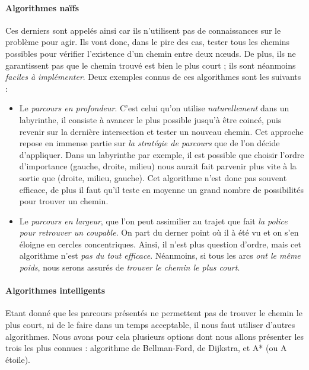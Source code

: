 \paragraph{Algorithmes naïfs} Ces derniers sont appelés ainsi car ils n'utilisent pas de connaissances sur le problème
pour agir. Ils vont donc, dans le pire des cas, tester tous les chemins possibles pour vérifier l'existence d'un chemin
entre deux n\oe{}uds. De plus, ils ne garantissent pas que le chemin trouvé est bien le plus court ; ils sont 
néanmoins \emph{faciles à implémenter}. Deux exemples connus de ces algorithmes sont les suivants :
\begin{itemize}
    \item Le \emph{parcours en profondeur}. C'est celui qu'on utilise \emph{naturellement} dans un labyrinthe, il consiste
    à avancer le plus possible jusqu'à être coincé, puis revenir sur la dernière intersection et tester un nouveau chemin.
    Cet approche repose en immense partie sur \emph{la stratégie de parcours} que de l'on décide d'appliquer. Dans un labyrinthe
    par exemple, il est possible que choisir l'ordre d'importance (gauche, droite, milieu) nous aurait fait parvenir plus vite
    à la sortie que (droite, milieu, gauche). Cet algorithme n'est donc pas souvent efficace, de plus il faut qu'il teste
    en moyenne un grand nombre de possibilités pour trouver un chemin.
    \item Le \emph{parcours en largeur}, que l'on peut assimilier au trajet que fait \emph{la police pour retrouver un
    coupable}. On part du derner point où il à été vu et on s'en éloigne en cercles concentriques. Ainsi, il n'est plus
    question d'ordre, mais cet algorithme n'est \emph{pas du tout efficace}. Néanmoins, si tous les arcs \emph{ont le
    même poids}, nous serons assurés de \emph{trouver le chemin le plus court}.
\end{itemize}

\paragraph{Algorithmes intelligents} Etant donné que les parcours présentés ne permettent pas de trouver le chemin
le plus court, ni de le faire dans un temps acceptable, il nous faut utiliser d'autres algorithmes. Nous avons pour
cela plusieurs options dont nous allons présenter les trois les plus connues : algorithme de Bellman-Ford, de Dijkstra,
et A* (ou A étoile).

